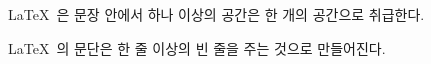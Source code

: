 \documentclass[11pt]{article}
\begin{document}
\LaTeX\    은 문장 안에서 하나     이상의 공간은   한 개의 공간으로 취급한다.

\setlength{\parindent}{1cm}
\LaTeX\ 의    문단은 한 줄 이상의 빈 줄을 주는 것으로 만들어진다.
\end{document}
